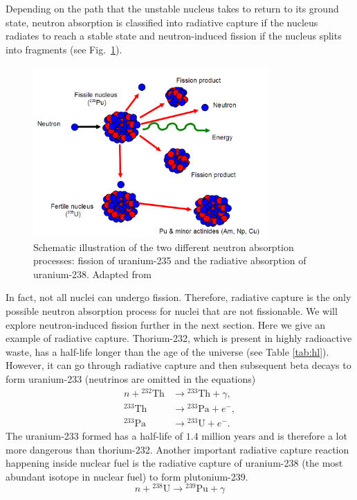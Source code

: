 \documentclass[nofootinbib,preprint,aps]{revtex4-1}
\begin{document}
    Depending on the path that the unstable nucleus takes to return to its ground
    state, neutron absorption is classified into radiative capture if the nucleus radiates to reach a stable
    state and neutron-induced fission if the nucleus splits into fragments (see Fig.~\ref{fig:both}).
        \begin{figure}[h]
            \centering
            \includegraphics[width=0.8\textwidth]{pu.png}
            \caption{Schematic illustration of the two different neutron absorption processes:
            fission of uranium-235 and the radiative absorption of uranium-238. Adapted from \cite{iync_2013}}
            \label{fig:both}
        \end{figure}
    In fact, not all nuclei can undergo fission.
    Therefore, radiative capture is the only possible neutron absorption process for
    nuclei that are not fissionable.\cite{lb01} We will explore neutron-induced fission further in
    the next section. Here we give an example of radiative capture. Thorium-232, which is present in highly radioactive
    waste, has a half-life longer than the age of the universe (see Table \ref{tab:hl}). However, it can go through
    radiative capture and then subsequent beta decays to form uranium-233 (neutrinos are omitted in the equations)
    \begin{align}
        n + {}^{232}\text{Th} &\rightarrow {}^{233}\text{Th} + \gamma,\\
        {}^{233}\text{Th} &\rightarrow {}^{233}\text{Pa} + e^-,\\
        {}^{233}\text{Pa} &\rightarrow {}^{233}\text{U} + e^-.
    \end{align}
    The uranium-233 formed has a half-life of $1.4$ million years and is therefore a lot more dangerous than
    thorium-232. Another important radiative capture reaction happening inside nuclear fuel is the radiative
    capture of uranium-238 (the most abundant isotope in nuclear fuel) to form plutonium-239.
    \begin{equation}
        n + {}^{238}\text{U} \rightarrow {}^{239}\text{Pu} + \gamma
    \end{equation}
\end{document}
